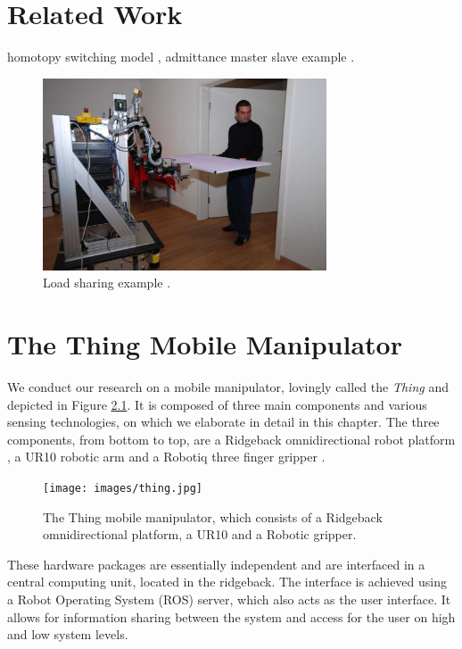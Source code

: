 \chapter{Related Work}
homotopy switching model \citep{evrard2009homotopy}, admittance master slave example \citep{tagliabue2017collaborative}.

\begin{figure}[h]
   \centering
   \includegraphics[width=0.75\textwidth]{images/lawitzky2010.png}
   \caption{Load sharing example \citep{lawitzky2010load}.}
   \label{pics:lawitzky2010}
\end{figure}

\chapter{The Thing Mobile Manipulator}
We conduct our research on a mobile manipulator, lovingly called the \emph{Thing} and depicted in Figure \ref{pics:thing}. It is composed of three main components and various sensing technologies, on which we elaborate in detail in this chapter. The three components, from bottom to top, are a Ridgeback omnidirectional robot platform \citep{ridgeback}, a UR10 robotic arm \citep{ur10} and a Robotiq three finger gripper \citep{robotiqGripper}.

\begin{figure}[h]
   \centering
   \texttt{[image: images/thing.jpg]}
   \caption{The Thing mobile manipulator, which consists of a Ridgeback omnidirectional platform, a UR10 and a Robotic gripper.}
   \label{pics:thing}
\end{figure}

These hardware packages are essentially independent and are interfaced in a central computing unit, located in the ridgeback. The interface is achieved using a Robot Operating System (ROS) server, which also acts as the user interface. It allows for information sharing between the system and access for the user on high and low system levels.

